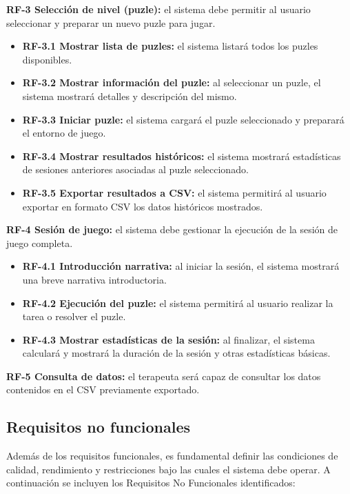 \noindent
\textbf{RF-3 Selección de nivel (puzle):} el sistema debe permitir al usuario seleccionar y preparar un nuevo puzle para jugar.  
\begin{itemize}
  \item \textbf{RF-3.1 Mostrar lista de puzles:} el sistema listará todos los puzles disponibles.
  \item \textbf{RF-3.2 Mostrar información del puzle:} al seleccionar un puzle, el sistema mostrará detalles y descripción del mismo.
  \item \textbf{RF-3.3 Iniciar puzle:} el sistema cargará el puzle seleccionado y preparará el entorno de juego.
  \item \textbf{RF-3.4 Mostrar resultados históricos:} el sistema mostrará estadísticas de sesiones anteriores asociadas al puzle seleccionado.
  \item \textbf{RF-3.5 Exportar resultados a CSV:} el sistema permitirá al usuario exportar en formato CSV los datos históricos mostrados.
\end{itemize}

\bigskip

\noindent
\textbf{RF-4 Sesión de juego:} el sistema debe gestionar la ejecución de la sesión de juego completa.  
\begin{itemize}
  \item \textbf{RF-4.1 Introducción narrativa:} al iniciar la sesión, el sistema mostrará una breve narrativa introductoria.
  \item \textbf{RF-4.2 Ejecución del puzle:} el sistema permitirá al usuario realizar la tarea o resolver el puzle.
  \item \textbf{RF-4.3 Mostrar estadísticas de la sesión:} al finalizar, el sistema calculará y mostrará la duración de la sesión y otras estadísticas básicas.
\end{itemize}

\bigskip

\noindent

\textbf{RF-5 Consulta de datos:} el terapeuta será capaz de consultar los datos contenidos en el CSV previamente exportado.

\subsection{Requisitos no funcionales}


Además de los requisitos funcionales, es fundamental definir las condiciones de calidad, rendimiento y restricciones bajo las cuales el sistema debe operar. A continuación se incluyen los Requisitos No Funcionales identificados:

